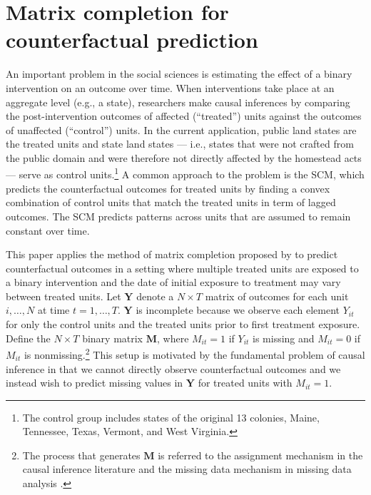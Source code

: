 \documentclass[12pt]{article}
\begin{document}

\section{Matrix completion for counterfactual prediction} \label{estimation}

An important problem in the social sciences is estimating the effect of a binary intervention on an outcome over time. When interventions take place at an aggregate level (e.g., a state), researchers make causal inferences by comparing the post-intervention outcomes of affected (``treated'') units against the outcomes of unaffected  (``control'') units. In the current application, public land states are the treated units and state land states --- i.e., states that were not crafted from the public domain and were therefore not directly affected by the homestead acts --- serve as control units.\footnote{The control group includes states of the original 13 colonies, Maine, Tennessee, Texas, Vermont, and West Virginia.} A common approach to the problem is the SCM, which predicts the counterfactual outcomes for treated units by finding a convex combination of control units that match the treated units in term of lagged outcomes. The SCM predicts patterns across units that are assumed to remain constant over time. 

This paper applies the method of matrix completion proposed by \citet{athey2017matrix} to predict counterfactual outcomes in a setting where multiple treated units are exposed to a binary intervention and the date of initial exposure to treatment may vary between treated units. Let $\mathbf{Y}$ denote a $N \times T$ matrix of outcomes for each unit $i, \ldots, N$ at time $t = 1, \ldots, T$. $\mathbf{Y}$ is incomplete because we observe each element $Y_{it}$ for only the control units and the treated units prior to first treatment exposure. Define the $N \times T$ binary matrix $\mathbf{M}$, where $M_{it} =1 $ if $Y_{it}$ is missing and $M_{it} = 0$ if $M_{it}$ is nonmissing.\footnote{The process that generates $\mathbf{M}$ is referred to the assignment mechanism in the causal inference literature \citep{imbens2015causal} and the missing data mechanism in missing data analysis \citep[Chap.~1]{little2014}.} This setup is motivated by the fundamental problem of causal inference \citep{holland1986statistics} in that we cannot directly observe counterfactual outcomes and we instead wish to predict missing values in $\mathbf{Y}$ for treated units with $M_{it}=1$. 
\end{document}
